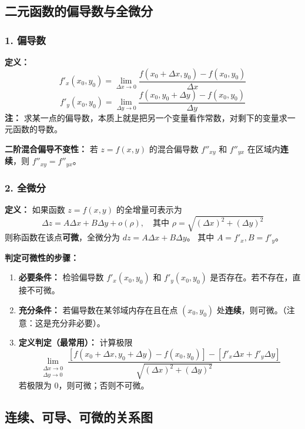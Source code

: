 \documentclass[a4paper,12pt]{ctexart}
\newenvironment{purplebox}
  {\begin{tcolorbox}[colback=white, colframe=boxpurple, boxrule=1pt, sharp corners, title=\textbf{定义/定理/核心公式}]}
  {\end{tcolorbox}}
\begin{document}
\subsection{二元函数的偏导数与全微分}

\subsubsection{1. 偏导数}
\textbf{定义：}
\[ f'_x(x_0,y_0) = \lim_{\Delta x \to 0} \frac{f(x_0+\Delta x, y_0) - f(x_0,y_0)}{\Delta x} \]
\[ f'_y(x_0,y_0) = \lim_{\Delta y \to 0} \frac{f(x_0, y_0+\Delta y) - f(x_0,y_0)}{\Delta y} \]
\textbf{注：} 求某一点的偏导数，本质上就是把另一个变量看作常数，对剩下的变量求一元函数的导数。

\textbf{二阶混合偏导不变性：}
若 $z=f(x,y)$ 的混合偏导数 $f''_{xy}$ 和 $f''_{yx}$ 在区域内\textbf{连续}，则 $f''_{xy} = f''_{yx}$。

\subsubsection{2. 全微分}
\begin{purplebox}
    \textbf{定义：} 如果函数 $z=f(x,y)$ 的全增量可表示为
    \[ \Delta z = A\Delta x + B\Delta y + o(\rho), \quad \text{其中 } \rho = \sqrt{(\Delta x)^2 + (\Delta y)^2} \]
    则称函数在该点\textbf{可微}，全微分为 $dz = A\Delta x + B\Delta y$。
    其中 $A = f'_x, B = f'_y$。
\end{purplebox}

\textbf{判定可微性的步骤：}
\begin{enumerate}
    \item \textbf{必要条件：} 检验偏导数 $f'_x(x_0,y_0)$ 和 $f'_y(x_0,y_0)$ 是否存在。若不存在，直接不可微。
    \item \textbf{充分条件：} 若偏导数在某邻域内存在且在点 $(x_0,y_0)$ 处\textbf{连续}，则可微。（注意：这是充分非必要）。
    \item \textbf{定义判定（最常用）：} 
    计算极限
    \[ \lim_{\substack{\Delta x \to 0 \\ \Delta y \to 0}} \frac{[f(x_0+\Delta x, y_0+\Delta y) - f(x_0,y_0)] - [f'_x\Delta x + f'_y\Delta y]}{\sqrt{(\Delta x)^2 + (\Delta y)^2}} \]
    若极限为 0，则可微；否则不可微。
\end{enumerate}

\subsection{连续、可导、可微的关系图}
\end{document}
